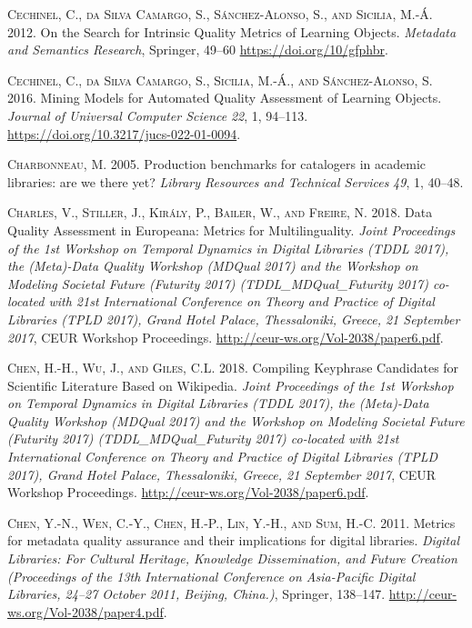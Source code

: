 \textsc{Cechinel, C., da Silva Camargo, S., Sánchez-Alonso, S., and Sicilia, M.-Á.} 2012. On the Search for Intrinsic Quality Metrics of Learning Objects. \emph{Metadata and Semantics Research}, Springer, 49–60 \url{https://doi.org/10/gfphbr}.

\textsc{Cechinel, C., da Silva Camargo, S., Sicilia, M.-Á., and Sánchez-Alonso, S.} 2016. Mining Models for Automated Quality Assessment of Learning Objects. \emph{Journal of Universal Computer Science} \emph{22}, 1, 94–113. \url{https://doi.org/10.3217/jucs-022-01-0094}.

\textsc{Charbonneau, M.} 2005. Production benchmarks for catalogers in academic libraries: are we there yet? \emph{Library Resources and Technical Services} \emph{49}, 1, 40–48.

\textsc{Charles, V., Stiller, J., Király, P., Bailer, W., and Freire, N.} 2018. Data Quality Assessment in Europeana: Metrics for Multilinguality. \emph{Joint Proceedings of the 1st Workshop on Temporal Dynamics in Digital Libraries (TDDL 2017), the (Meta)-Data Quality Workshop (MDQual 2017) and the Workshop on Modeling Societal Future (Futurity 2017) (TDDL\_MDQual\_Futurity 2017) co-located with 21st International Conference on Theory and Practice of Digital Libraries (TPLD 2017), Grand Hotel Palace, Thessaloniki, Greece, 21 September 2017}, CEUR Workshop Proceedings. \url{http://ceur-ws.org/Vol-2038/paper6.pdf}.

\textsc{Chen, H.-H., Wu, J., and Giles, C.L.} 2018. Compiling Keyphrase Candidates for Scientific Literature Based on Wikipedia. \emph{Joint Proceedings of the 1st Workshop on Temporal Dynamics in Digital Libraries (TDDL 2017), the (Meta)-Data Quality Workshop (MDQual 2017) and the Workshop on Modeling Societal Future (Futurity 2017) (TDDL\_MDQual\_Futurity 2017) co-located with 21st International Conference on Theory and Practice of Digital Libraries (TPLD 2017), Grand Hotel Palace, Thessaloniki, Greece, 21 September 2017}, CEUR Workshop Proceedings. \url{http://ceur-ws.org/Vol-2038/paper6.pdf}.

\textsc{Chen, Y.-N., Wen, C.-Y., Chen, H.-P., Lin, Y.-H., and Sum, H.-C.} 2011. Metrics for metadata quality assurance and their implications for digital libraries. \emph{Digital Libraries: For Cultural Heritage, Knowledge Dissemination, and Future Creation (Proceedings of the 13th International Conference on Asia-Pacific Digital Libraries, 24–27 October 2011, Beijing, China.)}, Springer, 138–147. \url{http://ceur-ws.org/Vol-2038/paper4.pdf}.

